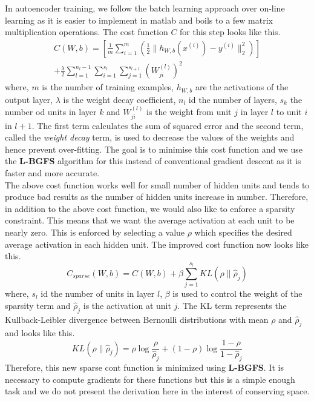 \documentclass[10pt,twocolumn,letterpaper]{article}
\begin{document}
In autoencoder training, we follow the batch learning approach over on-line learning as it is easier to implement in matlab and boils to a few matrix multiplication operations. The cost function $C$ for this step looks like this.
\begin{multline*}
C(W,b) = \left[\frac{1}{m}\displaystyle\sum\limits_{i=1}^m \left(\frac{1}{2}\|h_{W,b}(x^{(i)})-y^{(i)}\|^2_2\right)\right]\\
+\frac{\lambda}{2}\sum\limits_{l=1}^{n_l-1}\sum\limits_{i=1}^{s_l} \sum\limits_{j=1}^{s_{l+1}} (W_{ji}^{(l)})^2
\end{multline*}
where, $m$ is the number of training examples, $h_{W,b}$ are the activations of the output layer, $\lambda$ is the weight decay coefficient, $n_l$ id the number of layers, $s_k$ the number od units in layer $k$ and $W_{ji}^{(l)}$ is the weight from unit $j$ in layer $l$ to unit $i$ in $l+1$. The first term calculates the sum of squared error and the second term, called the \textit{weight decay} term, is used to decrease the values of the weights and hence prevent over-fitting. The goal is to minimise this cost function and we use the \textbf{L-BGFS} algorithm for this instead of conventional gradient descent as it is faster and more accurate.\\

The above cost function works well for small number of hidden units and tends to produce bad results as the number of hidden units increase in number. Therefore, in addition to the above cost function, we would also like to enforce a sparsity constraint. This means that we want the average activation at each unit to be nearly zero. This is enforced by selecting a value $\rho$ which specifies the desired average activation in each hidden unit. The improved cost function now looks like this. $$C_{sparse}(W,b) = C(W,b) + \beta\displaystyle\sum\limits_{j=1}^{s_l} KL(\rho\|\hat{\rho}_j)$$ where, $s_l$ id the number of units in layer $l$, $\beta$ is used to control the weight of the sparsity term and $\hat{\rho}_j$ is the activation at unit $j$. The KL term represents the Kullback-Leibler divergence between Bernoulli distributions with mean $\rho$ and $\hat{\rho}_j$ and looks like this.
$$KL(\rho\|\hat{\rho}_j) = \rho\log\frac{\rho}{\hat{\rho}_j} + (1-\rho)\log\frac{1-\rho}{1-\hat{\rho}_j}$$
Therefore, this new sparse cont function is minimized using \textbf{L-BGFS}. It is necessary to compute gradients for these functions but this is a simple enough task and we do not present the derivation here in the interest of conserving space.
\end{document}
